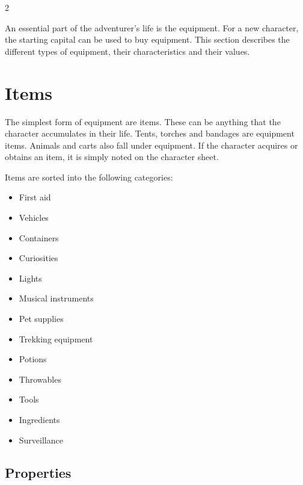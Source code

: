 \label{ch:equipment}

\begin{multicols}{2}

An essential part of the adventurer's life is the equipment. For a new character, the starting capital can be used to buy equipment. This section describes the different types of equipment, their characteristics and their values.

\section{Items}

The simplest form of equipment are items. These can be anything that the character accumulates in their life. Tents, torches and bandages are equipment items. Animals and carts also fall under equipment. If the character acquires or obtains an item, it is simply noted on the character sheet.

Items are sorted into the following categories:
\begin{itemize}
    \item First aid
    \item Vehicles
    \item Containers
    \item Curiosities
    \item Lights
    \item Musical instruments
    \item Pet supplies
    \item Trekking equipment
    \item Potions
    \item Throwables
    \item Tools
    \item Ingredients
    \item Surveillance
\end{itemize}

\subsection{Properties}


\end{multicols}
